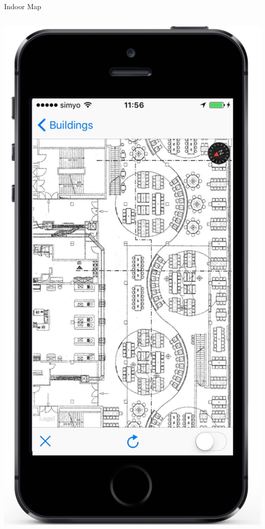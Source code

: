 \documentclass[11pt]{beamer}
\begin{document}
\begin{frame}{Indoor Map}
\begin{columns}[T]
\begin{column}{.4\textwidth}
    \includegraphics[scale=0.25]{mapisready}
  \end{column}
\end{columns}
\end{frame}
\end{document}
